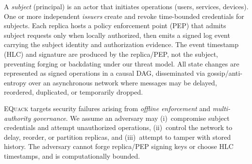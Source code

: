\documentclass[10pt,journal,compsoc]{IEEEtran}
\newcommand{\equack}{\textsc{EQuack}}
\begin{document}
A \emph{subject} (principal) is an actor that initiates operations (users, services, devices). One or more independent \emph{issuers} create and revoke time-bounded credentials for subjects. Each replica hosts a policy enforcement point (PEP) that admits subject requests only when locally authorized, then emits a signed log event carrying the subject identity and authorization evidence. The event timestamp (HLC) and signature are produced by the replica/PEP, not the subject, preventing forging or backdating under our threat model. All state changes are represented as signed operations in a causal DAG, disseminated via gossip/anti-entropy over an asynchronous network where messages may be delayed, reordered, duplicated, or temporarily dropped.

\equack{} targets security failures arising from \emph{offline enforcement} and \emph{multi-authority governance}. We assume an adversary may (i)~compromise subject credentials and attempt unauthorized operations, (ii)~control the network to delay, reorder, or partition replicas, and (iii)~attempt to tamper with stored history. The adversary cannot forge replica/PEP signing keys or choose HLC timestamps, and is computationally bounded.
\end{document}
